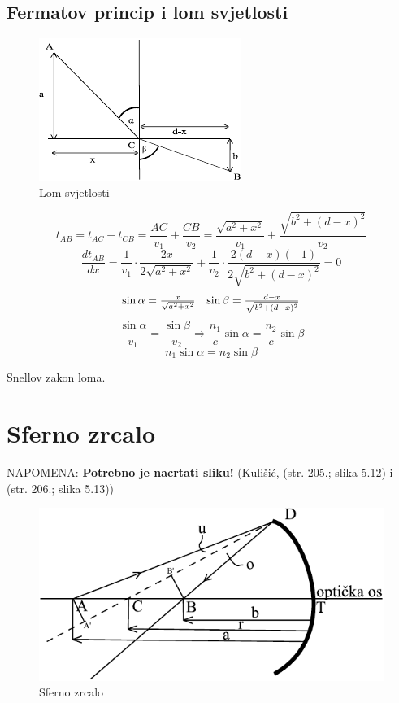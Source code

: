 \documentclass{report}
\begin{document}
{\subsection{Fermatov princip i lom svjetlosti}
\begin{figure}[htb!]
	\centering%
	\includegraphics{lom_svjetlosti.pdf}
  \caption{Lom svjetlosti}
  \label{lom_svjetlosti}
\end{figure}
$$t_{AB} = t_{AC} + t_{CB} = \frac{\overline{AC}}{v_1} + \frac{\overline{CB}}{v_2} = \frac{\sqrt{a^2 + x^2}}{v_1} + \frac{\sqrt{b^2 + (d-x)^2}}{v_2}$$
$$\frac{d t_{AB}}{dx} = \frac{1}{v_1} \cdot \frac{2x}{2\sqrt{a^2 + x^2}} + \frac{1}{v_2} \cdot \frac{2(d-x)(-1)}{2\sqrt{b^2+(d-x)^2}} = 0$$
$$\begin{array}{*{20}c}
   {\sin \alpha  = \frac{x}
{{\sqrt {a^2  + x^2 } }}} & {\sin \beta  = \frac{{d - x}}
{{\sqrt {b^2  + (d - x)^2 } }}}  \\
 \end{array} $$
$$\frac{\sin \alpha}{v_1} = \frac{\sin \beta}{v_2} \Rightarrow \frac{n_1}{c} \sin \alpha = \frac{n_2}{c}\sin \beta$$
$$n_1 \sin \alpha = n_2 \sin \beta$$
\begin{center}
\end{center}
Snellov zakon loma.

\section{Sferno zrcalo}
\textsc{NAPOMENA:} \textbf{Potrebno je nacrtati sliku!} (Kulišić, (str. 205.; slika 5.12) i (str. 206.; slika 5.13))
\begin{figure}[htb!]
	\centering%
	\includegraphics{sferno_zrcalo.pdf}
  \caption{Sferno zrcalo}
  \label{sferno_zrcalo}
\end{figure}

}
\end{document}
